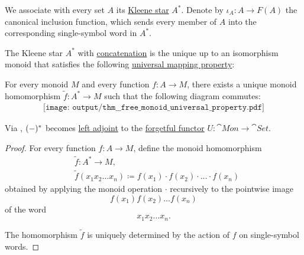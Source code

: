 \begin{proposition}\label{thm:free_monoid_universal_property}
  We associate with every set \( A \) its \hyperref[def:formal_language/kleene_star]{Kleene star} \( A^* \). Denote by \( \iota_A: A \to F(A) \) the canonical inclusion function, which sends every member of \( A \) into the corresponding single-symbol word in \( A^* \).

  The Kleene star \( A^* \) with \hyperref[def:formal_language/concatenation]{concatenation} is the unique up to an isomorphism monoid that satisfies the following \hyperref[rem:universal_mapping_property]{universal mapping property}:
  \begin{displayquote}
    For every monoid \( M \) and every function \( f: A \to M \), there exists a unique monoid homomorphism \( \widetilde{f}: A^* \to M \) such that the following diagram commutes:
    \begin{equation}\label{eq:thm:free_monoid_universal_property/diagram}
      \begin{aligned}
        \texttt{[image: output/thm\_\_free\_monoid\_universal\_property.pdf]}
      \end{aligned}
    \end{equation}
  \end{displayquote}

  Via , \( (\Anon*)^* \) becomes \hyperref[def:category_adjunction]{left adjoint} to the \hyperref[def:concrete_category]{forgetful functor} \( U: \cat{Mon} \to \cat{Set} \).
\end{proposition}
\begin{proof}
  For every function \( f: A \to M \), define the monoid homomorphism
  \begin{equation*}
    \begin{aligned}
      &\widetilde{f}: A^* \to M, \\
      &\widetilde{f}(x_1 x_2 \ldots x_n) \coloneqq f(x_1) \cdot f(x_2) \cdot \ldots \cdot f(x_n)
    \end{aligned}
  \end{equation*}
  obtained by applying the monoid operation \( \cdot \) recursively to the pointwise image
  \begin{equation*}
    f(x_1) f(x_2) \ldots f(x_n)
  \end{equation*}
  of the word
  \begin{equation*}
    x_1 x_2 \ldots x_n.
  \end{equation*}

  The homomorphism \( \widetilde{f} \) is uniquely determined by the action of \( f \) on single-symbol words.
\end{proof}

